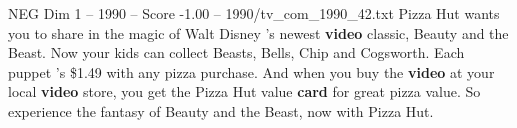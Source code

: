 \begin{textsample}{NEG Dim 1 – 1990 – Score -1.00 – 1990/tv\_com\_1990\_42.txt}  \label{ex:f1_neg_045}
Pizza Hut wants you to share in the magic of Walt Disney 's newest \textbf{video} classic, Beauty and the Beast.
Now your kids can collect Beasts, Bells, Chip and Cogsworth.
Each puppet 's \$1.49 with any pizza purchase.
And when you buy the \textbf{video} at your local \textbf{video} store, you get the Pizza Hut value \textbf{card} for great pizza value.
So experience the fantasy of Beauty and the Beast, now with Pizza Hut.

\end{textsample}

